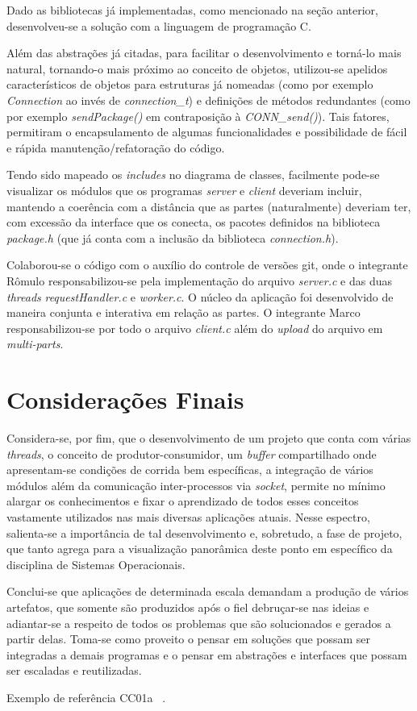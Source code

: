 \documentclass[12pt]{article}
\begin{document}
Dado as bibliotecas já implementadas, como mencionado na seção anterior, desenvolveu-se a solução com a linguagem de programação C.

Além das abstrações já citadas, para facilitar o desenvolvimento e torná-lo mais natural, tornando-o mais próximo ao conceito de objetos, utilizou-se apelidos característicos de objetos para estruturas já nomeadas (como por exemplo \emph{Connection} ao invés de \emph{connection\_t}) e definições de métodos redundantes (como por exemplo \emph{sendPackage()} em contraposição à \emph{CONN\_send()}). Tais fatores, permitiram o encapsulamento de algumas funcionalidades e possibilidade de fácil e rápida manutenção/refatoração do código.

Tendo sido mapeado os \emph{includes} no diagrama de classes, facilmente pode-se visualizar os módulos que os programas \emph{server} e \emph{client} deveriam incluir, mantendo a coerência com a distância que as partes (naturalmente) deveriam ter, com excessão da interface que os conecta, os pacotes definidos na biblioteca \emph{package.h} (que já conta com a inclusão da biblioteca \emph{connection.h}).

Colaborou-se o código com o auxílio do controle de versões git, onde o integrante Rômulo responsabilizou-se pela implementação do arquivo \emph{server.c} e das duas \emph{threads} \emph{requestHandler.c} e \emph{worker.c}. O núcleo da aplicação foi desenvolvido de maneira conjunta e interativa em relação as partes. O integrante Marco responsabilizou-se por todo o arquivo \emph{client.c} além do \textit{upload} do arquivo em \textit{multi-parts}.

\section{Considerações Finais}

Considera-se, por fim, que o desenvolvimento de um projeto que conta com várias \textit{threads}, o conceito de produtor-consumidor, um \textit{buffer} compartilhado onde apresentam-se condições de corrida bem específicas, a integração de vários módulos além da comunicação inter-processos via \textit{socket}, permite no mínimo alargar os conhecimentos e fixar o aprendizado de todos esses conceitos vastamente utilizados nas mais diversas aplicações atuais. Nesse espectro, salienta-se a importância de tal desenvolvimento e, sobretudo, a fase de projeto, que tanto agrega para a visualização panorâmica deste ponto em específico da disciplina de Sistemas Operacionais.

Conclui-se que aplicações de determinada escala demandam a produção de vários artefatos, que somente são produzidos após o fiel debruçar-se nas ideias e adiantar-se a respeito de todos os problemas que são solucionados e gerados a partir delas. Toma-se como proveito o pensar em soluções que possam ser integradas a demais programas e o pensar em abstrações e interfaces que possam ser escaladas e reutilizadas.

Exemplo de referência CC01a ~\cite{CC01}.

{}

\end{document}
